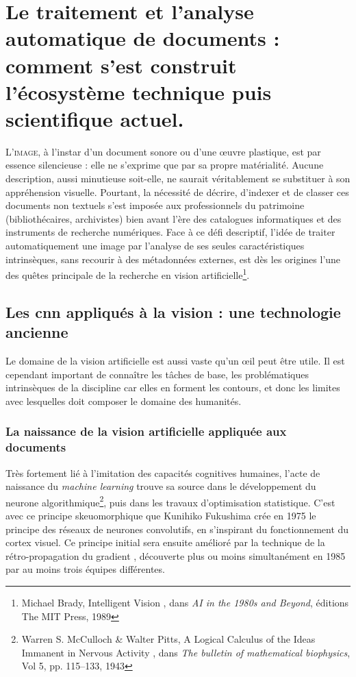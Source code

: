 \chapter[L'émergence du traitement d'images historiques]{Le traitement et l'analyse automatique de documents : comment s'est construit l'écosystème technique puis scientifique actuel.}


\lettrine{L}{'image}, à l'instar d'un document sonore ou d'une œuvre plastique, est par essence silencieuse : elle ne s'exprime que par sa propre matérialité. Aucune description, aussi minutieuse soit-elle, ne saurait véritablement se substituer à son appréhension visuelle. Pourtant, la nécessité de décrire, d'indexer et de classer ces documents non textuels s'est imposée aux professionnels du patrimoine (bibliothécaires, archivistes) bien avant l'ère des catalogues informatiques et des instruments de recherche numériques. Face à ce défi descriptif, l'idée de traiter automatiquement une image par l'analyse de ses seules caractéristiques intrinsèques, sans recourir à des métadonnées externes, est dès les origines l'une des quêtes principale de la recherche en vision artificielle\footnote{Michael Brady, \og Intelligent Vision \fg, dans \textit{AI in the 1980s and Beyond}, éditions The MIT Press, 1989}.

\section[L'origine de la vision documentaire]{Les \gls{cnn} appliqués à la vision : une technologie ancienne}

Le domaine de la vision artificielle est aussi vaste qu'un \oe il peut être utile. Il est cependant important de connaître les tâches de base, les problématiques intrinsèques de la discipline car elles en forment les contours, et donc les limites avec lesquelles doit composer le domaine des humanités. 

\subsection{La naissance de la vision artificielle appliquée aux documents}

Très fortement lié à l'imitation des capacités cognitives humaines, l'acte de naissance du \textit{machine learning} trouve sa source dans le développement du neurone algorithmique\footnote{Warren S. McCulloch \& Walter Pitts, \og A Logical Calculus of the Ideas Immanent in Nervous Activity \fg, dans \textit{The bulletin of mathematical biophysics}, Vol 5, pp. 115–133, 1943}, puis dans les travaux d'optimisation statistique. C'est avec ce principe skeuomorphique que Kunihiko Fukushima crée en 1975 le principe des réseaux de neurones convolutifs, en s'inspirant du fonctionnement du cortex visuel. Ce principe initial sera ensuite amélioré par la technique de la \og rétro-propagation du gradient \fg, découverte plus ou moins simultanément en 1985 par au moins trois équipes différentes. 


